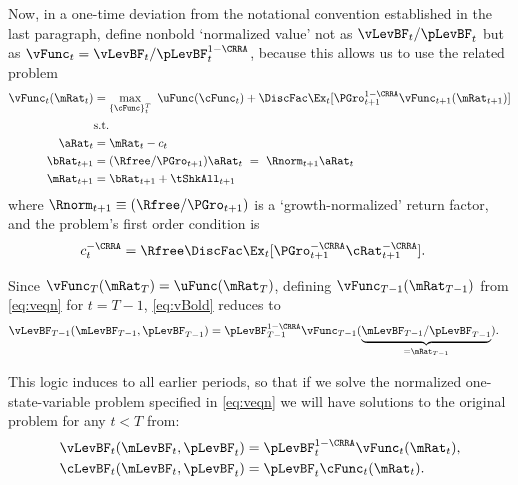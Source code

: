 \documentclass[BufferStockTheory]{subfiles}
\begin{document}
\hypertarget{The-Related-Problem}{}
Now, in a one-time deviation from the notational convention established in the last paragraph, define nonbold `normalized value' not as $\vLevBF_{t}/\pLevBF_{t}$ but as $\vFunc_{t} = \vLevBF_{t}/\pLevBF_{t}^{1-\CRRA}$, because this allows us to use the related problem 
\begin{align}
  \vFunc_{t}(\mRat_{t})  & = \max_{\{\cFunc\}_{t}^{T}}~  \uFunc(\cFunc_{t}) +\DiscFac \Ex_{t}[\PGro_{t+1}^{1-\CRRA}\vFunc_{t+1}({\mRat}_{t+1})] \notag \\
                         & \mbox{s.t.}  \label{eq:veqn} 
  \\ {\aRat}_{t}  & = \mRat_{t}-c_{t}  \notag
  \\ {\bRat}_{t+1}  & = (\Rfree/\PGro_{t+1})\aRat_{t}  ~ = ~ \Rnorm_{t+1}\aRat_{t}  \notag
  \\ \mRat_{t+1}  & = \bRat_{t+1}+\tShkAll_{t+1}  \notag %
\end{align}
where $\Rnorm_{t+1}\equiv (\Rfree/\PGro_{t+1})$ is a `growth-normalized' return factor, and the problem's first order condition is
\begin{align}
  c_{t}^{-\CRRA}  & = \Rfree \DiscFac \Ex_{t}[ {\PGro}_{t+1}^{-\CRRA} {\cRat}
                    _{t+1}^{-\CRRA}].  \label{eq:scaledeuler}
\end{align}

Since $\vFunc_{T}(\mRat_{T}) = \uFunc(\mRat_{T})$, defining $\vFunc_{T-1}(\mRat_{T-1})$ from \eqref{eq:veqn} for $t=T-1$, \eqref{eq:vBold} reduces to
\begin{align*}
  \vLevBF_{T-1}(\mLevBF_{T-1},\pLevBF_{T-1})  & = \pLevBF_{T-1}^{1-\CRRA} \vFunc_{T-1}(\underbrace{\mLevBF_{T-1}/\pLevBF_{T-1}}_{=\mRat_{T-1}}).
\end{align*}

This logic induces to all earlier periods, so that if we solve the
normalized one-state-variable problem specified in \eqref{eq:veqn} we
will have solutions to the original problem for any $t<T$
from:
\begin{align*}
  \vLevBF_{t}(\mLevBF_{t},\pLevBF_{t})  & = \pLevBF_{t}^{1-\CRRA}\vFunc_{t}(\mRat_{t}),
  \\ \cLevBF_{t}(\mLevBF_{t},\pLevBF_{t})  & = \pLevBF_{t}\cFunc_{t}(\mRat_{t}).
\end{align*}
\end{document}
